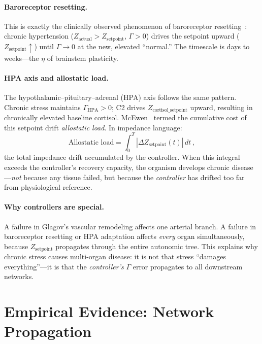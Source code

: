 \documentclass[aps,pre,twocolumn,superscriptaddress,floatfix]{revtex4-2}
\begin{document}
\paragraph{Baroreceptor resetting.}
This is exactly the clinically observed phenomenon of
baroreceptor resetting~\cite{Chapleau1991}:
chronic hypertension ($Z_{\text{actual}} >
Z_{\text{setpoint}}$, $\Gamma > 0$) drives the
setpoint upward ($Z_{\text{setpoint}} \uparrow$)
until $\Gamma \to 0$ at the new, elevated ``normal.''
The timescale is days to weeks---the $\eta$ of
brainstem plasticity.

\paragraph{HPA axis and allostatic load.}
The hypothalamic--pituitary--adrenal (HPA) axis
follows the same pattern.  Chronic stress
maintains $\Gamma_{\text{HPA}} > 0$;
C2 drives $Z_{\text{cortisol\_setpoint}}$ upward,
resulting in chronically elevated baseline cortisol.
McEwen~\cite{McEwen1998} termed the cumulative cost
of this setpoint drift \emph{allostatic load}.
In impedance language:
\begin{equation}
  \text{Allostatic load} =
  \int_0^T |\Delta Z_{\text{setpoint}}(t)|\,dt\,,
  \label{eq:allostatic}
\end{equation}
the total impedance drift accumulated by the
controller.  When this integral exceeds the
controller's recovery capacity, the organism
develops chronic disease---\emph{not} because
any tissue failed, but because the \emph{controller}
has drifted too far from physiological reference.

\paragraph{Why controllers are special.}
A failure in Glagov's vascular remodeling affects one
arterial branch.  A failure in baroreceptor resetting
or HPA adaptation affects \emph{every} organ simultaneously,
because $Z_{\text{setpoint}}$ propagates through the
entire autonomic tree.  This explains why chronic stress
causes multi-organ disease: it is not that stress
``damages everything''---it is that the \emph{controller's}
$\Gamma$ error propagates to all downstream networks.


\section{Empirical Evidence: Network Propagation}
\label{sec:nhanes-proof}
\end{document}
